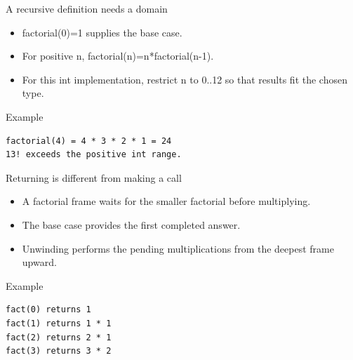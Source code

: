 \documentclass[10pt,aspectratio=169]{beamer}
\begin{document}
\begin{frame}[fragile,t]{A recursive definition needs a domain}
\begin{itemize}
\item factorial(0)=1 supplies the base case.
\item For positive n, factorial(n)=n*factorial(n-1).
\item For this int implementation, restrict n to 0..12 so that results fit the chosen type.
\end{itemize}
\vspace{1mm}\begin{block}{Example}
\begin{lstlisting}
factorial(4) = 4 * 3 * 2 * 1 = 24
13! exceeds the positive int range.
\end{lstlisting}
\end{block}
\end{frame}

\begin{frame}[fragile,t]{Returning is different from making a call}
\begin{itemize}
\item A factorial frame waits for the smaller factorial before multiplying.
\item The base case provides the first completed answer.
\item Unwinding performs the pending multiplications from the deepest frame upward.
\end{itemize}
\vspace{1mm}\begin{block}{Example}
\begin{lstlisting}
fact(0) returns 1
fact(1) returns 1 * 1
fact(2) returns 2 * 1
fact(3) returns 3 * 2
\end{lstlisting}
\end{block}
\end{frame}
\end{document}
